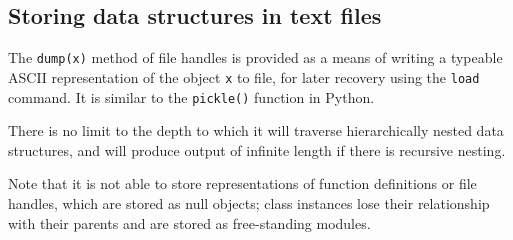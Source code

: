 \subsection{Storing data structures in text files}

The {\tt dump(x)} method of file handles is provided as a means of writing a
typeable ASCII representation of the object {\tt x} to file, for later recovery
using the {\tt load} command. It is similar to the {\tt pickle()} function in
Python.

There is no limit to the depth to which it will traverse hierarchically nested
data structures, and will produce output of infinite length if there is
recursive nesting.

Note that it is not able to store representations of function definitions or
file handles, which are stored as null objects; class instances lose their
relationship with their parents and are stored as free-standing modules.
